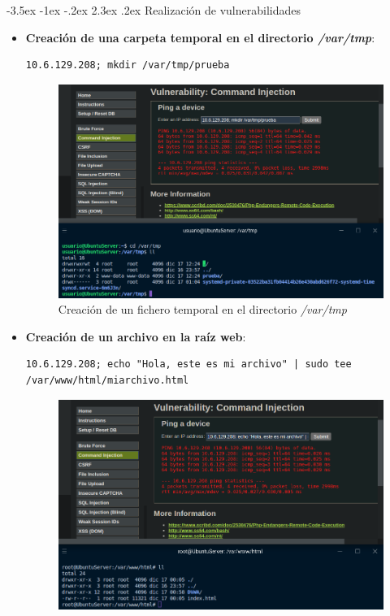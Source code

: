 \documentclass[11pt]{report}
\makeatletter
\renewcommand\chapter{\@startsection{chapter}{0}{\z@}%
    {-3.5ex \@plus -1ex \@minus -.2ex}%
    {2.3ex \@plus.2ex}%
    {\normalfont\Large\bfseries}}
\makeatother
\begin{document}
\chapter{Realización de vulnerabilidades}
\begin{itemize}
  \item \textbf{Creación de una carpeta temporal en el directorio \emph{/var/tmp}}:
        \begin{verbatim}
10.6.129.208; mkdir /var/tmp/prueba
        \end{verbatim}
        \begin{figure}[H]
          \centering
          \includegraphics[scale=0.35]{img/UbuntuServer/UbuntuServer_Base_1.png}
          \caption{Creación de un fichero temporal en el directorio \emph{/var/tmp}}
        \end{figure}
  \item \textbf{Creación de un archivo en la raíz web}:
        \begin{verbatim}
10.6.129.208; echo "Hola, este es mi archivo" | sudo tee /var/www/html/miarchivo.html
        \end{verbatim}
        \begin{figure}[H]
          \centering
          \includegraphics[scale=0.35]{img/UbuntuServer/UbuntuServer_Base_2.png}

\end{figure}
\end{itemize}
\end{document}
